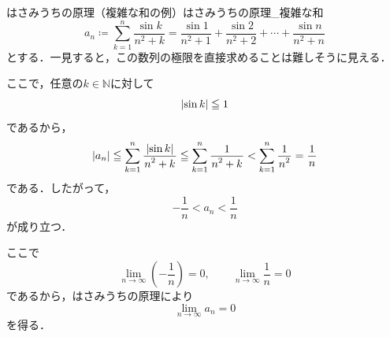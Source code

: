\begin{example}{はさみうちの原理（複雑な和の例）}{はさみうちの原理_複雑な和}
  \[
    a_n
    \coloneqq
    \sum_{k=1}^{n}\frac{\sin k}{n^2+k}
    =
    \frac{\sin 1}{n^2+1}
    +\frac{\sin 2}{n^2+2}
    +\cdots
    +\frac{\sin n}{n^2+n}
  \]
  とする．一見すると，この数列の極限を直接求めることは難しそうに見える．

  ここで，任意の$k\in\mathbb{N}$に対して
  \[
    \lvert\sin k\rvert\leqq 1
  \]
  であるから，
  \[
    \abs{a_n}
    \leqq
    \sum_{k=1}^{n}\frac{\abs{\sin k}}{n^2+k}
    \leqq
    \sum_{k=1}^{n}\frac{1}{n^2+k}
    <
    \sum_{k=1}^{n}\frac{1}{n^2}
    =
    \frac{1}{n}
  \]
  である．したがって，
  \[
    -\frac{1}{n} < a_n < \frac{1}{n}
  \]
  が成り立つ．

  ここで
  \[
    \lim_{n\to\infty}\left(-\frac{1}{n}\right)=0,
    \qquad
    \lim_{n\to\infty}\frac{1}{n}=0
  \]
  であるから，はさみうちの原理により
  \[
    \lim_{n\to\infty}a_n=0
  \]
  を得る．
\end{example}
